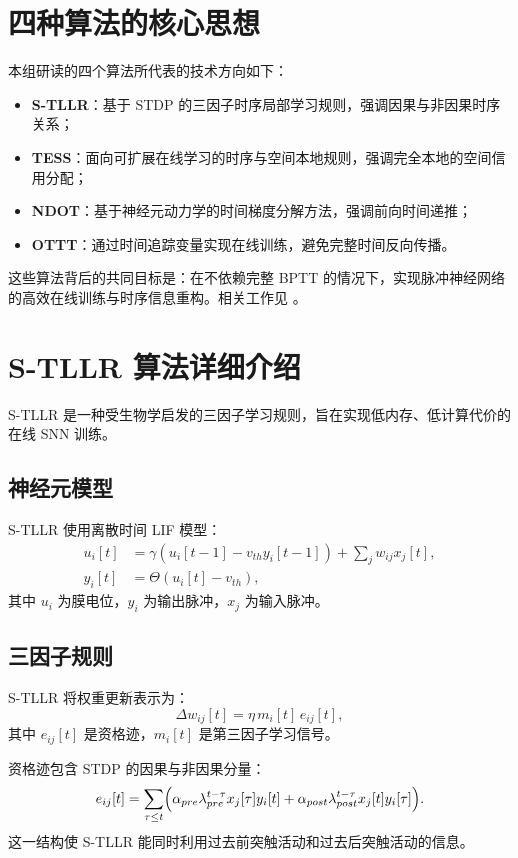 \documentclass[journal,12pt,onecolumn]{IEEEtran}
\begin{document}
\section{四种算法的核心思想}
本组研读的四个算法所代表的技术方向如下：
\begin{itemize}
  \item \textbf{S-TLLR}：基于 STDP 的三因子时序局部学习规则，强调因果与非因果时序关系；
  \item \textbf{TESS}：面向可扩展在线学习的时序与空间本地规则，强调完全本地的空间信用分配；
  \item \textbf{NDOT}：基于神经元动力学的时间梯度分解方法，强调前向时间递推；
  \item \textbf{OTTT}：通过时间追踪变量实现在线训练，避免完整时间反向传播。
\end{itemize}

这些算法背后的共同目标是：在不依赖完整 BPTT 的情况下，实现脉冲神经网络的高效在线训练与时序信息重构。相关工作见 \cite{apolinario_s-tllr_2024,apolinario2025tess,jiang2024ndot,xiao2022online}。

\section{S-TLLR 算法详细介绍}
S-TLLR 是一种受生物学启发的三因子学习规则，旨在实现低内存、低计算代价的在线 SNN 训练。

\subsection{神经元模型}
S-TLLR 使用离散时间 LIF 模型：
\begin{align}
  u_i[t] &= \gamma (u_i[t-1] - v_{th} y_i[t-1]) + \sum_j w_{ij} x_j[t], \\
  y_i[t] &= \Theta(u_i[t] - v_{th}),
\end{align}
其中 $u_i$ 为膜电位，$y_i$ 为输出脉冲，$x_j$ 为输入脉冲。

\subsection{三因子规则}
S-TLLR 将权重更新表示为：
\begin{equation}
  \Delta w_{ij}[t] = \eta \, m_i[t] \, e_{ij}[t],
\end{equation}
其中 $e_{ij}[t]$ 是资格迹，$m_i[t]$ 是第三因子学习信号。

资格迹包含 STDP 的因果与非因果分量：
\begin{equation}
  e_{ij}[t] = \sum_{\tau \le t} \Bigl(\alpha_{pre} \lambda_{pre}^{t-\tau} x_j[\tau] y_i[t] + \alpha_{post} \lambda_{post}^{t-\tau} x_j[t] y_i[\tau] \Bigr).
\end{equation}
这一结构使 S-TLLR 能同时利用过去前突触活动和过去后突触活动的信息。
\end{document}
